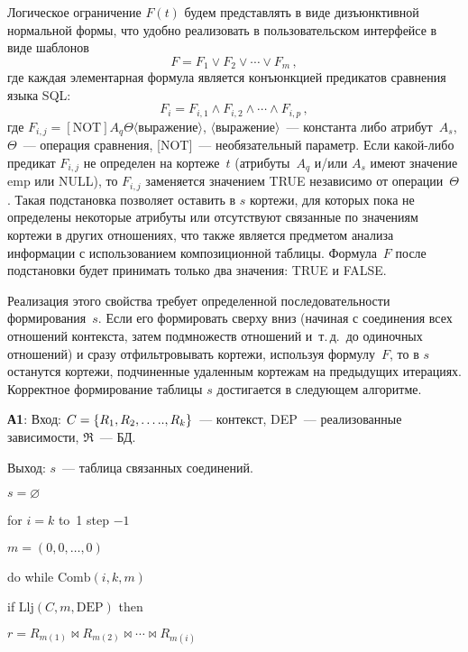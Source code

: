 \begin{multicols}{2}
  Логическое ограничение $F(t)$ будем пред\-став\-лять в виде дизъюнктивной 
нормальной формы, что удобно реализовать в пользовательском интерфейсе в 
виде шаблонов
  $$
F=F_1\vee F_2\vee\cdots\vee  F_m\,,
$$
где каждая элементарная формула является конъюнкцией предикатов 
сравнения языка SQL:
$$
F_i=F_{i,1}\wedge F_{i,2}\wedge\cdots\wedge  F_{i,p}\,,
$$
где $F_{i,j}=[\mathrm{NOT}]A_q\Theta\langle \mbox{выражение}\rangle$, 
$\langle\mbox{выражение}\rangle$~--- константа либо атрибут~$A_s$, 
$\Theta$~--- операция сравнения, [NOT]~--- необязательный параметр. Если 
ка\-кой-ли\-бо предикат $F_{i,j}$ не определен на кортеже~$t$ (атрибуты~$A_q$ 
и/или $A_s$ имеют значение emp или NULL), то $F_{i,j}$ заменяется 
значением TRUE независимо от операции~$\Theta$. Такая подстановка 
позволяет оставить в $s$ кортежи, для которых пока не определены некоторые 
атрибуты или отсутствуют связанные по значениям кортежи в других 
отношениях, что также является предметом анализа информации с 
использованием композиционной таблицы. Формула~$F$ после подстановки 
будет принимать только два значения: TRUE и FALSE.
  
  Реализация этого свойства требует определенной последовательности 
формирования~$s$. Если его формировать сверху вниз (начиная с соединения 
всех отношений контекста, затем подмножеств отношений и~т.\,д.\ до 
одиночных отношений) и сразу отфильтровывать кортежи, используя 
формулу~$F$, то в $s$ останутся кортежи, подчиненные удаленным кортежам 
на предыдущих итерациях. Корректное формирование таблицы $s$ достигается 
в следующем алгоритме.
  
  \smallskip
  
\noindent
\textbf{А1}: Вход: $C\hm=\{R_1, R_2, \ldots .., R_k\}$~--- контекст, DEP~--- 
реализованные зависимости, $\Re$~--- БД.

  Выход: $s$~--- таблица связанных соединений.
  
\noindent
$s=\varnothing$

\noindent
for $i=k$ to~1 step $-1$

\hspace*{1mm}$m=(0,0,\ldots ,0)$

\hspace*{1mm}do while $\mathrm{Comb}\left(i,k,m\right)$

\hspace{2mm}if $\mathrm{Llj}\left(C,m,\mathrm{DEP}\right)$ then

\hspace*{3mm}$r = R_{m(1)}\bowtie R_{m(2)}\bowtie\cdots\bowtie R_{m(i)}$


\end{multicols}
